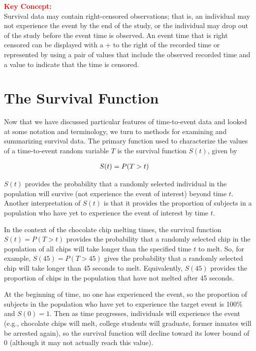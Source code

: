 \documentclass[
]{report}
\begin{document}
\large

\textbf{\textcolor{red}{Key Concept:}}\\
\color{red}
Survival data may contain right-censored observations; that is, an individual may not experience the event by the end of the study, or the individual may drop out of the study before the event time is observed. An event time that is right censored can be displayed with a + to the right of the recorded time or represented by using a pair of values that include the observed recorded time and a value to indicate that the time is censored.\\
\color{black}
\normalsize

\section{\texorpdfstring{\textbf{The Survival Function}}{The Survival Function}}\label{the-survival-function}

Now that we have discussed particular features of time-to-event data and looked at some notation and terminology, we turn to methods for examining and summarizing survival data. The primary function used to characterize the values of a time-to-event random variable \(T\) is the survival function \(S(t)\), given by

\begin{align}
S(t) &= P(T > t)
\notag
\end{align}

\(S(t)\) provides the probability that a randomly selected individual in the population will survive (not experience the event of interest) beyond time \(t\). Another interpretation of \(S(t)\) is that it provides the proportion of subjects in a population who have yet to experience the event of interest by time \(t\).

In the context of the chocolate chip melting times, the survival function \(S(t) = P(T > t)\) provides the probability that a randomly selected chip in the population of all chips will take longer than the specified time \(t\) to melt. So, for example, \(S(45) = P(T > 45)\) gives the probability that a randomly selected chip will take longer than 45 seconds to melt. Equivalently, \(S(45)\) provides the proportion of chips in the population that have not melted after 45 seconds.

At the beginning of time, no one has experienced the event, so the proportion of subjects in the population who have yet to experience the target event is 100\% and \(S(0) = 1\). Then as time progresses, individuals will experience the event (e.g., chocolate chips will melt, college students will graduate, former inmates will be arrested again), so the survival function will decline toward its lower bound of 0 (although it may not actually reach this value).
\end{document}
